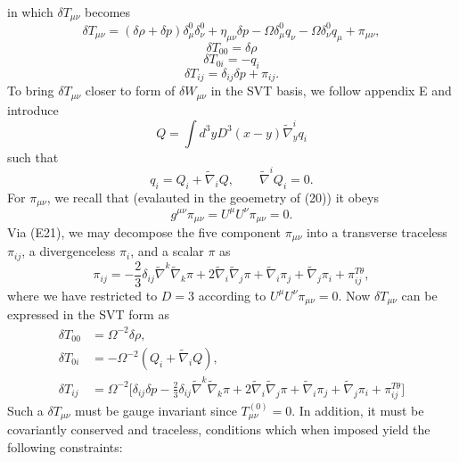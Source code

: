 \documentclass[10pt,letterpaper]{article}
\begin{document}
in which $\delta T_{\mu\nu}$ becomes
\begin{equation}
	\delta T_{\mu\nu} = (\delta \rho + \delta p)\delta^0_\mu \delta^0_\nu +  \eta_{\mu\nu}\delta p - \Omega \delta^0_\mu q_\nu -\Omega\delta^0_\nu q_\mu + \pi_{\mu\nu},
\end{equation}
\begin{equation}
\delta T_{00} =\delta \rho
\end{equation}
\begin{equation}
\delta T_{0i} = -q_i
\end{equation}
\begin{equation}
\delta T_{ij} =  \delta_{ij} \delta p + \pi_{ij}.
\end{equation}
To bring $\delta T_{\mu\nu}$ closer to form of $\delta W_{\mu\nu}$ in the SVT basis, we follow appendix E and introduce
\begin{equation}
	Q = \int d^3y D^3(x-y) \tilde\nabla^i_y q_i
\end{equation}
such that
\begin{equation}
	 q_i = Q_i + \tilde\nabla_i Q,\qquad \tilde\nabla^i Q_i = 0.
\end{equation}
For $\pi_{\mu\nu}$, we recall that (evalauted in the geoemetry of (20)) it obeys 
\begin{equation}
	g^{\mu\nu}\pi_{\mu\nu} = U^\mu U^\nu \pi_{\mu\nu} = 0.
\end{equation} 
Via (E21), we may decompose the five component $\pi_{\mu\nu}$ into a transverse traceless $\pi_{ij}$, a divergenceless $\pi_i$, and a scalar $\pi$ as
\begin{equation}
	\pi_{ij} = -\frac{2}{3} \delta_{ij}\tilde\nabla^k \tilde\nabla_k \pi  + 2\tilde\nabla_i\tilde\nabla_j \pi + \tilde\nabla_i \pi_j + \tilde\nabla_j \pi_i + \pi_{ij}^{T\theta},
\end{equation}
where we have restricted to $D=3$ according to $U^\mu U^\nu \pi_{\mu\nu} = 0$. Now $\delta T_{\mu\nu}$ can be expressed in the SVT form as
\begin{align}
\delta T_{00}  &= \Omega^{-2} \delta \rho,
\nonumber\\	
\delta T_{0i} &= -\Omega^{-2} ( Q_i + \tilde\nabla_i Q),
\nonumber\\	
\delta T_{ij}  &= \Omega^{-2}\bigg[ \delta_{ij} \delta p -\frac{2}{3} \delta_{ij}\tilde\nabla^k \tilde\nabla_k \pi + 2\tilde\nabla_i\tilde\nabla_j \pi + \tilde\nabla_i \pi_j + \tilde\nabla_j \pi_i + \pi_{ij}^{T\theta}\bigg]
\end{align} 
Such a $\delta T_{\mu\nu}$ must be gauge invariant since $T^{(0)}_{\mu\nu} = 0$. In addition, it must be covariantly conserved and traceless, conditions which when imposed yield the following constraints:
\end{document}
